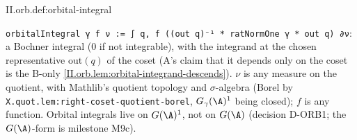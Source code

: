 \begin{definition}
\end{definition}
\begin{tfformal}{II.orb.def:orbital-integral}
\begin{tffidelity}
\texttt{orbitalIntegral γ f ν := ∫ q, f ((out q)⁻¹ * ratNormOne γ * out q) ∂ν}: a Bochner integral ($0$ if not integrable), with the integrand at the chosen representative $\mathrm{out}(q)$ of the coset (A's claim that it depends only on the coset is the B-only \cref{II.orb.lem:orbital-integrand-descends}). $\nu$ is any measure on the quotient, with Mathlib's quotient topology and $\sigma$-algebra (Borel by \texttt{X.quot.lem:right-coset-quotient-borel}, $G_\gamma(\A)^1$ being closed); $f$ is any function. Orbital integrals live on $G(\A)^1$, not on $G(\A)$ (decision D-ORB1; the $G(\A)$-form is milestone M9c).
\end{tffidelity}
\end{tfformal}

